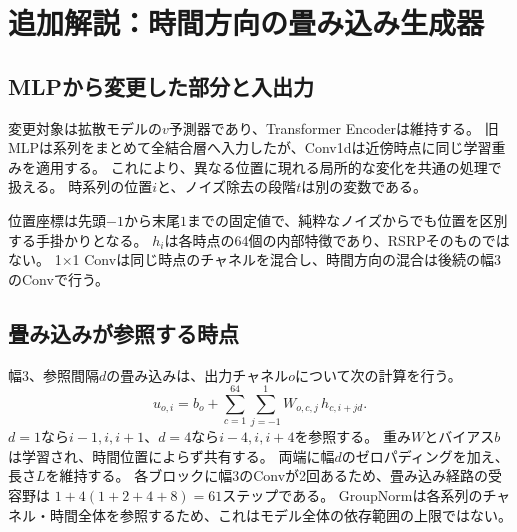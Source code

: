 \documentclass[a4paper,10pt]{article}
\begin{document}
\newpage
\section{追加解説：時間方向の畳み込み生成器}
\subsection{MLPから変更した部分と入出力}
変更対象は拡散モデルの$v$予測器であり、Transformer Encoderは維持する。
旧MLPは系列をまとめて全結合層へ入力したが、Conv1dは近傍時点に同じ学習重みを適用する。
これにより、異なる位置に現れる局所的な変化を共通の処理で扱える。
時系列の位置$i$と、ノイズ除去の段階$t$は別の変数である。

\begin{center}
\end{center}
位置座標は先頭$-1$から末尾$1$までの固定値で、純粋なノイズからでも位置を区別する手掛かりとなる。
$h_i$は各時点の64個の内部特徴であり、RSRPそのものではない。
1$\times$1 Convは同じ時点のチャネルを混合し、時間方向の混合は後続の幅3のConvで行う。

\subsection{畳み込みが参照する時点}
幅3、参照間隔$d$の畳み込みは、出力チャネル$o$について次の計算を行う。
\[
 u_{o,i}=b_o+\sum_{c=1}^{64}\sum_{j=-1}^{1}W_{o,c,j}\,h_{c,i+jd}.
\]
$d=1$なら$i-1,i,i+1$、$d=4$なら$i-4,i,i+4$を参照する。
重み$W$とバイアス$b$は学習され、時間位置によらず共有する。
両端に幅$d$のゼロパディングを加え、長さ$L$を維持する。
各ブロックに幅3のConvが2回あるため、畳み込み経路の受容野は
$1+4(1+2+4+8)=61$ステップである。
GroupNormは各系列のチャネル・時間全体を参照するため、これはモデル全体の依存範囲の上限ではない。
\end{document}
